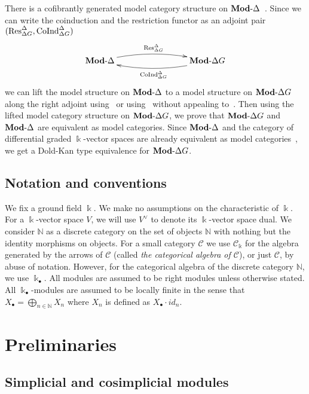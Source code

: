 \documentclass[a4paper,11pt]{amsart}
\theoremstyle{definition}
\newcommand{\C}[1]{\mathcal{#1}}
\newcommand{\B}[1]{\mathbb{#1}}
\newcommand{\rmod}[1]{\text{{\bf Mod}-}{#1}}
\newcommand{\Res}{\text{\rm Res}}
\newcommand{\CoInd}{\text{\rm CoInd}}
\newcommand{\Simp}{{\Delta}}
\begin{document}
There is a cofibrantly generated model category structure on $\rmod{\Simp}$~\cite{jardine_2003,SchwedeShipley03}. Since we can write the coinduction and the restriction functor as an adjoint pair $(\Res^{\Simp}_{\Simp G}, \CoInd^{\Simp}_{\Simp G})$
\begin{equation}\label{eq:adjunction}
 \xymatrix{
   \rmod{\Simp} \ar@/^{2ex}/[rrr]^{\Res_{\Simp G}^\Simp} &&&
   \ar@/^{2ex}/[lll]^{\CoInd_{\Simp G}^\Simp} \rmod{\Simp G} 
 }
\end{equation}
we can lift the model structure on $\rmod{\Simp}$ to a model structure on $\rmod{\Simp G}$ along the right adjoint using~\cite{hirschhorn2009model} or using~\cite[Thm.7.44]{heuts_simplicial_2022} without appealing to~\cite{hess2015, hess2017necessary}. Then using the lifted model category structure on $\rmod{\Simp G}$, we prove that $\rmod{\Simp G}$ and $\rmod{\Simp}$ are equivalent as model categories. Since $\rmod{\Simp}$ and the category of differential graded $\Bbbk$-vector spaces are already equivalent as model categories~\cite{SchwedeShipley03}, we get a Dold-Kan type equivalence for $\rmod{\Simp G}$.

\subsection*{Notation and conventions}

We fix a ground field $\Bbbk$. We make no assumptions on the characteristic of $\Bbbk$.  For a $\Bbbk$-vector space $V$, we will use $V^\vee$ to denote its $\Bbbk$-vector space dual. We consider $\B{N}$ as a discrete category on the set of objects $\B{N}$ with nothing but the identity morphisms on objects. For a small category $\C{C}$ we use $\C{C}_{\Bbbk}$ for the algebra generated by the arrows of $\C{C}$ (called \emph{the categorical algebra of $\C{C}$}), or just $\C{C}$, by abuse of notation. However, for the categorical algebra of the discrete category $\B{N}$, we use $\Bbbk_\bullet$. All modules are assumed to be right modules unless otherwise stated. All $\Bbbk_\bullet$-modules are assumed to be locally finite in the sense that $X_\bullet = \bigoplus_{n\in\B{N}} X_n$ where $X_n$ is defined as $X_\bullet\cdot id_n$.

\section{Preliminaries}

\subsection{Simplicial and cosimplicial modules}
\end{document}
